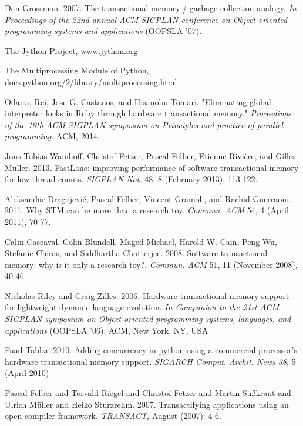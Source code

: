 \documentclass{sigplanconf}
\begin{document}
\begin{thebibliography}{}
\softraggedright

  Dan Grossman. 2007. The transactional memory / garbage collection
  analogy. \emph{In Proceedings of the 22nd annual ACM SIGPLAN
    conference on Object-oriented programming systems and
    applications} (OOPSLA '07).

  The Jython Project, \url{www.jython.org}

  The Multiprocessing Module of Python,
  \url{docs.python.org/2/library/multiprocessing.html}

  Odaira, Rei, Jose G. Castanos, and Hisanobu Tomari.  "Eliminating
  global interpreter locks in Ruby through hardware transactional
  memory."  \emph{Proceedings of the 19th ACM SIGPLAN symposium on
    Principles and practice of parallel programming.} ACM, 2014.

  Jons-Tobias Wamhoff, Christof Fetzer, Pascal Felber, Etienne Rivière,
  and Gilles Muller. 2013. FastLane: improving performance of software
  transactional memory for low thread counts. \emph{SIGPLAN Not.} 48, 8
  (February 2013), 113-122.

 Aleksandar Dragojević, Pascal Felber, Vincent
  Gramoli, and Rachid Guerraoui. 2011. Why STM can be more than a
  research toy. \emph{Commun. ACM} 54, 4 (April 2011), 70-77.

  Calin Cascaval, Colin Blundell, Maged Michael, Harold W. Cain, Peng
  Wu, Stefanie Chiras, and Siddhartha Chatterjee. 2008. Software
  transactional memory: why is it only a research
  toy?. \emph{Commun. ACM} 51, 11 (November 2008), 40-46.

  Nicholas Riley and Craig Zilles. 2006. Hardware transactional memory
  support for lightweight dynamic language evolution. \emph{In
    Companion to the 21st ACM SIGPLAN symposium on Object-oriented
    programming systems, languages, and applications} (OOPSLA
  '06). ACM, New York, NY, USA

  Fuad Tabba. 2010. Adding concurrency in python using a commercial
  processor's hardware transactional memory support. \emph{SIGARCH
  Comput. Archit. News 38}, 5 (April 2010)

  Pascal Felber and Torvald Riegel and Christof Fetzer and Martin
  Süßkraut and Ulrich Müller and Heiko Sturzrehm. 2007. Transactifying
  applications using an open compiler framework. \emph{TRANSACT}, August
  (2007): 4-6.


\end{thebibliography}
\end{document}
